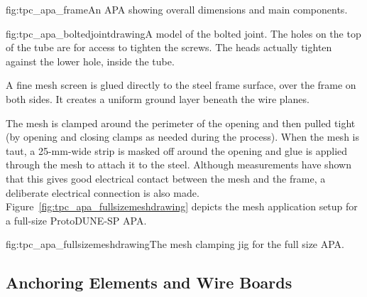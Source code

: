 \begin{dunefigure}{fig:tpc_apa_frame}{An APA showing overall dimensions and main components. }
\end{dunefigure}

\begin{dunefigure}{fig:tpc_apa_boltedjointdrawing}{A model of the bolted joint.  The holes on the top of the tube are for access to tighten the screws.  The heads actually tighten against the lower hole, inside the tube.}
\end{dunefigure}

A fine mesh screen is glued directly to the steel frame surface, over the frame on both sides.  It creates a uniform ground layer beneath the wire planes.  

The mesh is clamped around the perimeter of the opening and then pulled tight (by opening and closing clamps as needed during the process).  When the mesh is taut, a 25-mm-wide strip is masked off around the opening and glue is applied through the mesh to attach it to the steel.  Although measurements have shown that this gives good electrical contact between the mesh and the frame, a deliberate electrical connection is also made.  Figure~\ref{fig:tpc_apa_fullsizemeshdrawing} depicts the mesh application setup for a full-size ProtoDUNE-SP APA.

\begin{dunefigure}{fig:tpc_apa_fullsizemeshdrawing}{The mesh clamping jig for the full size APA. }
\end{dunefigure}


\subsection{Anchoring Elements and Wire Boards}
\label{sec:fdsp-apa-boards}


